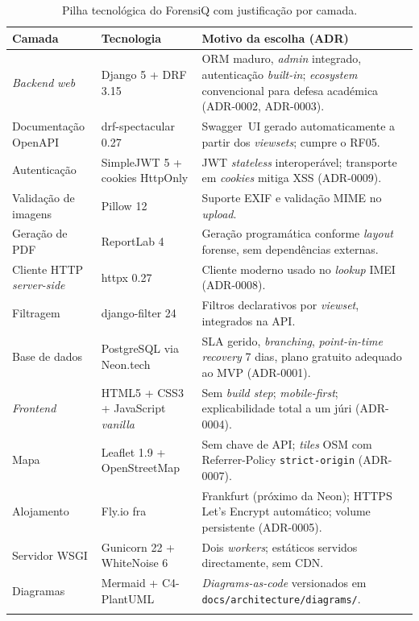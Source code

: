\begin{longtable}{@{}L{3.2cm}L{4.3cm}L{7.0cm}@{}}
\toprule
\textbf{Camada} & \textbf{Tecnologia} & \textbf{Motivo da escolha (ADR)} \\
\midrule
\endhead
\emph{Backend} \emph{web}              & Django 5 + DRF 3.15  & ORM maduro, \emph{admin} integrado, autenticação \emph{built-in}; \emph{ecosystem} convencional para defesa académica (ADR-0002, ADR-0003). \\
\midrule
Documentação OpenAPI                   & drf-spectacular 0.27 & Swagger~UI gerado automaticamente a partir dos \emph{viewsets}; cumpre o RF05. \\
\midrule
Autenticação                           & SimpleJWT 5 + cookies HttpOnly & JWT \emph{stateless} interoperável; transporte em \emph{cookies} mitiga XSS (ADR-0009). \\
\midrule
Validação de imagens                   & Pillow 12             & Suporte EXIF e validação MIME no \emph{upload}. \\
\midrule
Geração de PDF                         & ReportLab 4           & Geração programática conforme \emph{layout} forense, sem dependências externas. \\
\midrule
Cliente HTTP \emph{server-side}        & httpx 0.27            & Cliente moderno usado no \emph{lookup} IMEI (ADR-0008). \\
\midrule
Filtragem                              & django-filter 24      & Filtros declarativos por \emph{viewset}, integrados na API. \\
\midrule
Base de dados                          & PostgreSQL via Neon.tech & SLA gerido, \emph{branching}, \emph{point-in-time recovery} 7 dias, plano gratuito adequado ao MVP (ADR-0001). \\
\midrule
\emph{Frontend}                        & HTML5 + CSS3 + JavaScript \emph{vanilla} & Sem \emph{build step}; \emph{mobile-first}; explicabilidade total a um júri (ADR-0004). \\
\midrule
Mapa                                   & Leaflet 1.9 + OpenStreetMap & Sem chave de API; \emph{tiles} OSM com Referrer-Policy \texttt{strict-origin} (ADR-0007). \\
\midrule
Alojamento                             & Fly.io fra            & Frankfurt (próximo da Neon); HTTPS Let's Encrypt automático; volume persistente (ADR-0005). \\
\midrule
Servidor WSGI                          & Gunicorn 22 + WhiteNoise 6 & Dois \emph{workers}; estáticos servidos directamente, sem CDN. \\
\midrule
Diagramas                              & Mermaid + C4-PlantUML & \emph{Diagrams-as-code} versionados em \texttt{docs/architecture/diagrams/}. \\
\bottomrule
\caption{Pilha tecnológica do ForensiQ com justificação por camada.}\label{tab:stack}
\end{longtable}

